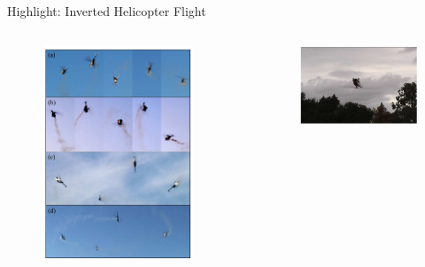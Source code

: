 \documentclass{beamer}
\begin{document}
\begin{frame}{Highlight: Inverted Helicopter Flight}
  \begin{columns}
    \begin{column}{0.3\textwidth}
      \begin{figure}
        \includegraphics[width=0.9\textwidth]{assets/helicopter_2}
      \end{figure}
    \end{column}
    \begin{column}{0.65\textwidth}
      \begin{figure}
        \includegraphics[width=\textwidth]{assets/helicopter_1}
      \end{figure}
    \end{column}
  \end{columns}
\end{frame}
\end{document}
